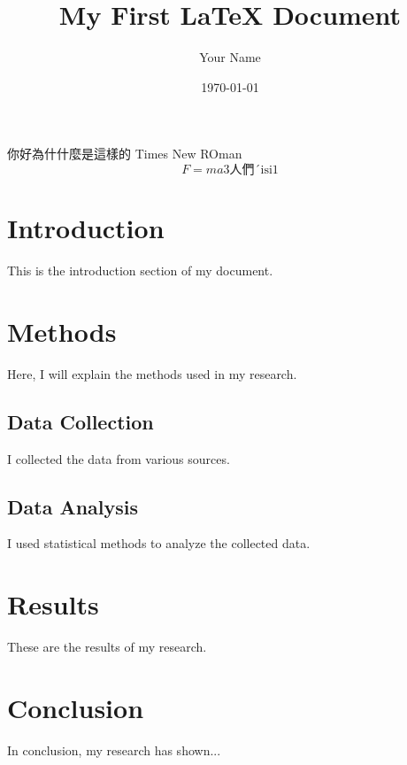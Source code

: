 \documentclass{article}
\begin{document}
\title{My First LaTeX Document}
\author{Your Name}
\date{\today}

\maketitle

你好為什什麼是這樣的 Times New ROman
\begin{equation}
    F=ma\textrm{3人們´isi}1
\end{equation}
\section{Introduction}
This is the introduction section of my document.

\section{Methods}
Here, I will explain the methods used in my research.

\subsection{Data Collection}
I collected the data from various sources.

\subsection{Data Analysis}
I used statistical methods to analyze the collected data.

\section{Results}
These are the results of my research.

\section{Conclusion}
In conclusion, my research has shown...
\end{document}
